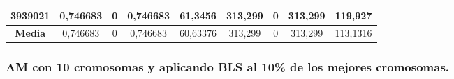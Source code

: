 \documentclass[12pt, spanish]{article}
\begin{document}
\begin{table}[H]
\begin{tabular}{|c|c|c|c|c|c|c|c|c|}
3939021           & 0,746683                      & 0                           & 0,746683                   & 61,3456          & 313,299                   & 0                           & 313,299                & 119,927    \\ \hline
\textbf{Media}    & 0,746683                      & 0                           & 0,746683                   & 60,63376           & 313,299                   & 0                           & 313,299                & 113,1316   \\ \hline
\end{tabular}
\end{table}


\subsubsection{AM con 10 cromosomas y aplicando BLS al 10\% de los mejores cromosomas.}
\end{document}
